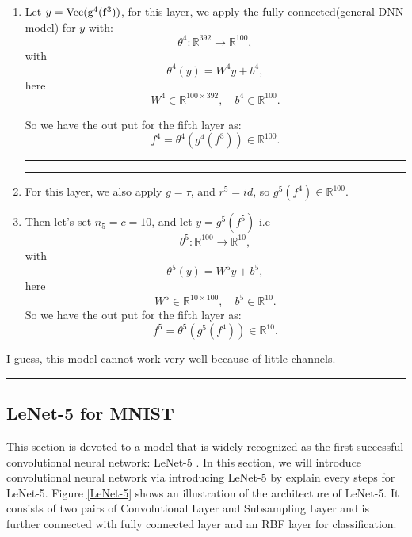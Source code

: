 \begin{enumerate}
	\item Let $y = \rm{Vec}(g^4(f^3))$, for this layer, we apply the fully connected(general DNN model) for $y$ with:
	\begin{equation}
	\theta^4: \mathbb{R}^{392} \to \mathbb R^{100},
	\end{equation}
	with 
	\begin{equation}
	\theta^4(y) = W^4 y + b^4,
	\end{equation}
	here 
	\begin{equation}
	W^4 \in \mathbb{R}^{100\times 392}, \quad b^4 \in \mathbb{R}^{100}.
	\end{equation}
	
	So we have the out put for the fifth layer as:
	\begin{equation}
	f^4 = \theta^4(g^4(f^3)) \in \mathbb{R}^{100}.
	\end{equation}
	
	\bigskip \hrule \bigskip  
	\bigskip \hrule \bigskip
	\item For this layer, we also apply $g = \tau$, and $r^5 = id$, so $g^{5}(f^4) \in \mathbb{R}^{100}$.
	
	\item Then let's set $n_5 = c =  10$, and let $y = g^5(f^5)$  i.e 
	\begin{equation}
	\theta^5: \mathbb{R}^{100} \to \mathbb R^{10},
	\end{equation}
	with 
	\begin{equation}
	\theta^5(y) = W^5 y + b^5,
	\end{equation}
	here 
	\begin{equation}
	W^5 \in \mathbb{R}^{10\times 100}, \quad b^5 \in \mathbb{R}^{10}.
	\end{equation}
	So we have the out put for the fifth layer as:
	\begin{equation}
	f^5 = \theta^5(g^5(f^4)) \in \mathbb{R}^{10}.
	\end{equation}
	
\end{enumerate}

\begin{remark}
	I guess, this model cannot work very well because of little channels.
\end{remark}
\bigskip \hrule \bigskip



\subsection{LeNet-5 for MNIST}
This section is devoted to a model that is widely recognized as the
first successful convolutional neural network: LeNet-5
\cite{Lecun1998Gradient}. In this section, we will introduce
convolutional neural network via introducing LeNet-5 by explain every
steps for LeNet-5.  Figure \ref{LeNet-5} shows an illustration of the
architecture of LeNet-5. It consists of two pairs of Convolutional
Layer and Subsampling Layer and is further connected with fully
connected layer and an RBF layer for classification.


